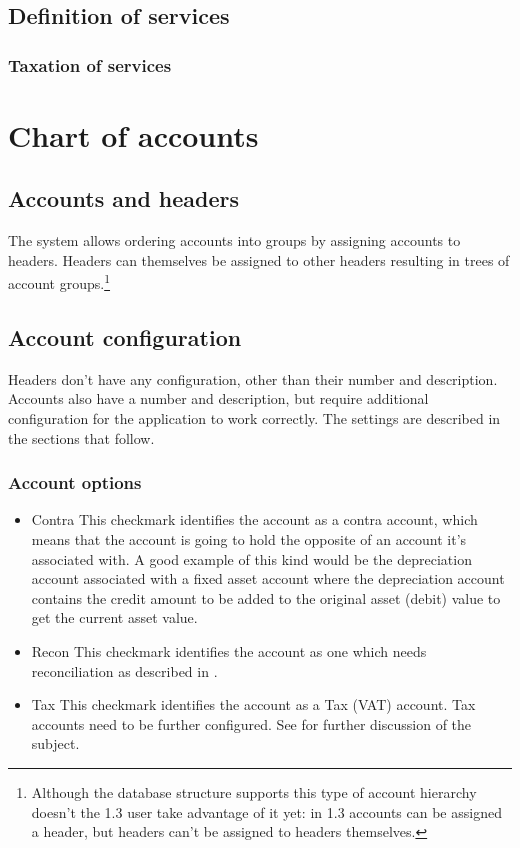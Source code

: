 \section{Definition of services}


\subsection{Taxation of services}
\label{subsec-service-taxation}



\chapter{Chart of accounts}
\label{cha-chart-of-accounts}

\section{Accounts and headers}

The system allows ordering accounts into groups by assigning accounts to headers. Headers
can themselves be assigned to other headers resulting in trees of account groups.\footnote{Although the database structure supports this type of account hierarchy
doesn't the 1.3 user take advantage of it yet: in 1.3 accounts can be assigned a header,
but headers can't be assigned to headers themselves.}



\section{Account configuration}

Headers don't have any configuration, other than their number and description. Accounts also
have a number and description, but require additional configuration for the application to work
correctly. The settings are described in the sections that follow.

\subsection{Account options}
\label{sec-account-options}
\begin{itemize}
\item Contra This checkmark identifies the account as a contra account, which means
   that the account is going to hold the opposite of an account it's associated with.
   A good example of this kind would be the depreciation account associated with a fixed
   asset account where the depreciation account contains the credit amount to be added to
   the original asset (debit) value to get the current asset value.
\item Recon This checkmark identifies the account as one which needs reconciliation as
   described in .
\item Tax This checkmark identifies the account as a Tax (VAT) account. Tax accounts need
   to be further configured. See  for further discussion of the
   subject.
   \label{item:AccountOptionsTax}
\end{itemize}

